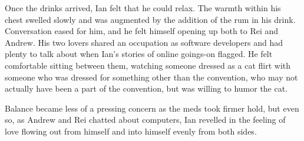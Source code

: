 Once the drinks arrived, Ian felt that he could relax. The warmth within his chest swelled slowly and was augmented by the addition of the rum in his drink. Conversation eased for him, and he felt himself opening up both to Rei and Andrew. His two lovers shared an occupation as software developers and had plenty to talk about when Ian's stories of online goings-on flagged. He felt comfortable sitting between them, watching someone dressed as a cat flirt with someone who was dressed for something other than the convention, who may not actually have been a part of the convention, but was willing to humor the cat.

Balance became less of a pressing concern as the meds took firmer hold, but even so, as Andrew and Rei chatted about computers, Ian revelled in the feeling of love flowing out from himself and into himself evenly from both sides.

